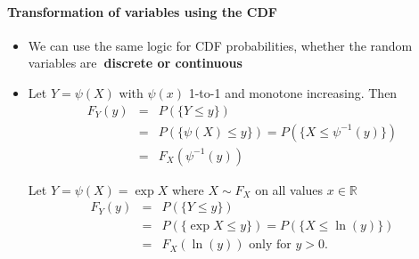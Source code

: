 \documentclass[notes=show,smaller,handout]{beamer}\usepackage[]{graphicx}\usepackage[]{color}
\renewcommand{\Pr}{P}
\newenvironment{stepitemize}{\begin{itemize}[<+->]}{\end{itemize} }
\begin{document}
\begin{frame}{\secname}
\framesubtitle{Transformation of variables using the CDF}

  \begin{stepitemize}
  \item We can use the same logic for CDF probabilities, whether the random
  variables are\textbf{\ discrete or continuous}

  \item Let $Y=\psi \left( X\right) $ with $\psi \left( x\right) $ 1-to-1 and
  monotone increasing. Then
  \begin{eqnarray*}
  F_{Y}\left( y\right) &=&\Pr \left( \{ Y\leq y \}\right) \\
  &=&\Pr \left( \{ \psi \left( X\right) \leq y \} \right) =\Pr \left( \{ X\leq \psi
  ^{-1}\left( y\right) \} \right) \\
  &=&F_{X}\left( \psi ^{-1}\left( y\right) \right)
  \end{eqnarray*}

  \begin{example}
  Let $Y=\psi \left( X\right) =\exp{ X} $ where $%
  X\sim F_X$ on all values $x\in
  \mathbb{R}
  $%
  \begin{eqnarray*}
  F_{Y}\left( y\right) &=&\Pr \left( \{ Y\leq y \} \right) \\
  &=&\Pr \left( \{ \exp{  X} \leq y \} \right) =\Pr \left( \{ X\leq \ln
  \left( y\right) \} \right) \\
  &=&F_{X}\left( \ln \left( y\right) \right) \text{ only for }y>0\text{.}
  \end{eqnarray*}
  \end{example}

  \end{stepitemize}

\end{frame}%
\end{document}
